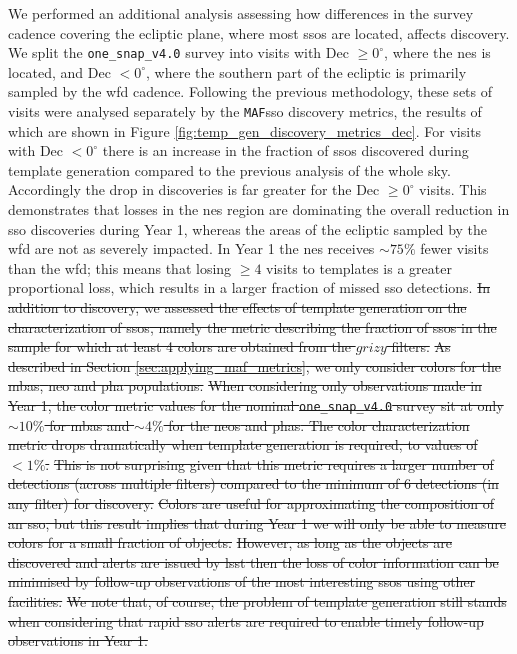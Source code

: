 \documentclass[preprintm,linenumbers]{aastex631}
\newcommand{\baseline}{\texttt{one\_snap\_v4.0}\xspace}
\newcommand{\maf}{\texttt{MAF}\xspace}
\begin{document}
We performed an additional analysis assessing how differences in the survey cadence covering the ecliptic plane, where most \glspl*{sso} are located, affects discovery.
We split the \baseline survey into visits with Dec $\geq 0^{\circ}$, where the \gls*{nes} is located, and Dec $< 0^{\circ}$, where the southern part of the ecliptic is primarily sampled by the \gls*{wfd} cadence.
  Following the previous methodology, these sets of visits were analysed separately by the \maf \gls*{sso} discovery metrics, the results of which are shown in Figure \ref{fig:temp_gen_discovery_metrics_dec}.
For visits with Dec $<0^{\circ}$ there is an increase in the fraction of \glspl*{sso} discovered during template generation compared to the previous analysis of the whole sky.
Accordingly the drop in discoveries is far greater for the Dec $\geq 0^{\circ}$ visits.
This demonstrates that losses in the \gls*{nes} region are dominating the overall reduction in \gls*{sso} discoveries during Year 1, whereas the areas of the ecliptic sampled by the \gls*{wfd} are not as severely impacted.
In Year 1 the \gls*{nes} receives $\sim75\%$ fewer visits than the \gls*{wfd}; this means that losing $\geq4$ visits to templates is a greater proportional loss, which results in a larger fraction of missed \gls*{sso} detections.
\sout{In addition to discovery, we assessed the effects of template generation on the characterization of \glspl*{sso}, namely the metric describing the fraction of \glspl*{sso} in the sample for which at least 4 colors are obtained from the $grizy$ filters.}
		\sout{As described in Section \ref{sec:applying_maf_metrics},  we only consider colors for the \glspl*{mba}, \gls*{neo} and \gls*{pha} populations.}
\sout{When considering only observations made in Year 1, the color metric values for the nominal \baseline survey sit at only $\sim10\%$ for \glspl*{mba} and $\sim4\%$ for the \glspl*{neo} and \glspl*{pha}.
  The color characterization metric drops dramatically when template generation is required, to values of $<1\%$.}
\sout{This is not surprising given that this metric requires a larger number of detections (across multiple filters) compared to the minimum of 6 detections (in any filter) for discovery.}
  \sout{Colors are useful for approximating the composition of an \gls*{sso}, but this result implies that during Year 1 we will only be able to measure colors for a small fraction of objects.}
  \sout{However, as long as the objects are discovered and alerts are issued by \gls*{lsst} then the loss of color information can be minimised by follow-up observations of the most interesting \glspl*{sso} using other facilities.}
  \sout{We note that, of course, the problem of template generation still stands when considering that rapid \gls*{sso} alerts are required to enable timely follow-up observations in Year 1. }
		
\end{document}
